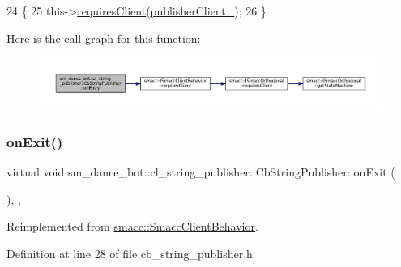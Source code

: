 \begin{DoxyCode}
24     \{
25         this->\hyperlink{classsmacc_1_1ISmaccClientBehavior_a32b16e99e3b4cb289414203dc861a440}{requiresClient}(\hyperlink{classsm__dance__bot_1_1cl__string__publisher_1_1CbStringPublisher_aafcad6e6296a3088cb91ffeb22025bd6}{publisherClient\_});
26     \}
\end{DoxyCode}
Here is the call graph for this function\+:
\nopagebreak
\begin{figure}[H]
\begin{center}
\leavevmode
\includegraphics[width=350pt]{classsm__dance__bot_1_1cl__string__publisher_1_1CbStringPublisher_a7aa533578e820ee90d92d15b85d42e9b_cgraph}
\end{center}
\end{figure}
\mbox{\label{classsm__dance__bot_1_1cl__string__publisher_1_1CbStringPublisher_ac93cc1eb150140331cb3e560ec8249e2}} 
\subsubsection{\texorpdfstring{on\+Exit()}{onExit()}}
{\footnotesize\ttfamily virtual void sm\+\_\+dance\+\_\+bot\+::cl\+\_\+string\+\_\+publisher\+::\+Cb\+String\+Publisher\+::on\+Exit (\begin{DoxyParamCaption}{ }\end{DoxyParamCaption})\hspace{0.3cm}{\ttfamily [inline]}, {\ttfamily [override]}, {\ttfamily [virtual]}}



Reimplemented from \hyperlink{classsmacc_1_1SmaccClientBehavior_a7e4fb6ce81ff96dc172425852d69c0c5}{smacc\+::\+Smacc\+Client\+Behavior}.



Definition at line 28 of file cb\+\_\+string\+\_\+publisher.\+h.



